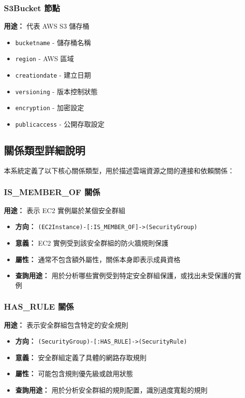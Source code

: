 \documentclass[11pt,a4paper]{ctexart}
\begin{document}
\subsubsection{S3Bucket 節點}
\textbf{用途：} 代表 AWS S3 儲存桶
\begin{itemize}[leftmargin=1.5em]
\item \texttt{bucketname} - 儲存桶名稱
\item \texttt{region} - AWS 區域
\item \texttt{creationdate} - 建立日期
\item \texttt{versioning} - 版本控制狀態
\item \texttt{encryption} - 加密設定
\item \texttt{publicaccess} - 公開存取設定
\end{itemize}

\subsection{關係類型詳細說明}

本系統定義了以下核心關係類型，用於描述雲端資源之間的連接和依賴關係：

\subsubsection{IS\_MEMBER\_OF 關係}
\textbf{用途：} 表示 EC2 實例屬於某個安全群組
\begin{itemize}[leftmargin=1.5em]
\item \textbf{方向：} \texttt{(EC2Instance)-[:IS\_MEMBER\_OF]->(SecurityGroup)}
\item \textbf{意義：} EC2 實例受到該安全群組的防火牆規則保護
\item \textbf{屬性：} 通常不包含額外屬性，關係本身即表示成員資格
\item \textbf{查詢用途：} 用於分析哪些實例受到特定安全群組保護，或找出未受保護的實例
\end{itemize}

\subsubsection{HAS\_RULE 關係}
\textbf{用途：} 表示安全群組包含特定的安全規則
\begin{itemize}[leftmargin=1.5em]
\item \textbf{方向：} \texttt{(SecurityGroup)-[:HAS\_RULE]->(SecurityRule)}
\item \textbf{意義：} 安全群組定義了具體的網路存取規則
\item \textbf{屬性：} 可能包含規則優先級或啟用狀態
\item \textbf{查詢用途：} 用於分析安全群組的規則配置，識別過度寬鬆的規則
\end{itemize}
\end{document}
